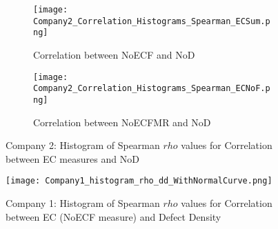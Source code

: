 \documentclass[times]{smrauth}
\begin{document}

\begin{figure}
\begin{subfigure}[h]{0.50\textwidth}
  \texttt{[image: Company2\_Correlation\_Histograms\_Spearman\_ECSum.png]}
  \caption{Correlation between NoECF and NoD}
  \label{Company2_spearman_histogram_rho_ecsum}
\end{subfigure}%
\begin{subfigure}[h]{0.50\textwidth}
  \texttt{[image: Company2\_Correlation\_Histograms\_Spearman\_ECNoF.png]}
  \caption{Correlation between NoECFMR and NoD}
  \label{Company2_spearman_histogram_rho_ecnof}
\end{subfigure}
\caption{Company 2: Histogram of Spearman $rho$ values for Correlation between EC measures and NoD}
\label{fig:Company2_spearman_histogram_rho}
\end{figure}

\begin{figure}[h]
\centering
\texttt{[image: Company1\_histogram\_rho\_dd\_WithNormalCurve.png]}
\caption{Company 1: Histogram of Spearman $rho$ values for Correlation between EC (NoECF measure) and Defect Density}
\label{Company1_histogram_rho_dd}	
\end{figure}

\end{document}
